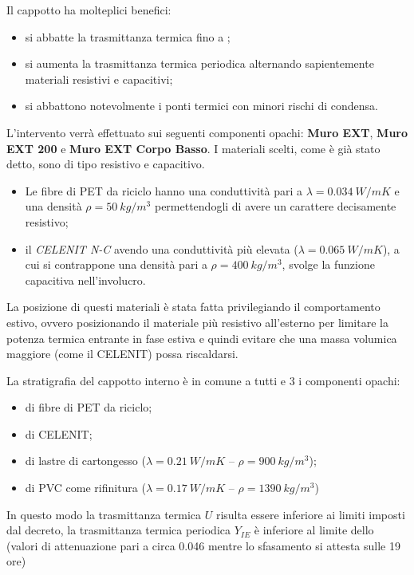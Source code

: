 Il cappotto ha molteplici benefici:
\begin{itemize}
	\item si abbatte la trasmittanza termica fino a ;
	\item si aumenta la trasmittanza termica periodica alternando sapientemente materiali resistivi e capacitivi;
	\item si abbattono notevolmente i ponti termici con minori rischi di condensa.
\end{itemize}
L'intervento verrà effettuato sui seguenti componenti opachi: \textbf{Muro EXT}, \textbf{Muro EXT 200} e \textbf{Muro EXT Corpo Basso}. I materiali scelti, come è già stato detto, sono di tipo resistivo e capacitivo.
\begin{itemize}
	\item Le fibre di PET da riciclo hanno una conduttività pari a $\lambda=\SI{0.034}{W/mK}$ e una densità $\rho=\SI{50}{kg/m^3}$ permettendogli di avere un carattere decisamente resistivo;
	\item il \emph{CELENIT N-C} avendo una conduttività più elevata ($\lambda=\SI{0.065}{W/mK}$), a cui si contrappone una densità pari a $\rho=\SI{400}{kg/m^3}$, svolge la funzione capacitiva nell'involucro.
\end{itemize}
La posizione di questi materiali è stata fatta privilegiando il comportamento estivo, ovvero posizionando il materiale più resistivo all'esterno per limitare la potenza termica entrante in fase estiva e quindi evitare che una massa volumica maggiore (come il CELENIT) possa riscaldarsi.

La stratigrafia del cappotto interno è in comune a tutti e 3 i componenti opachi:
\begin{itemize}
	\item {} di fibre di PET da riciclo;
	\item {} di CELENIT;
	\item {} di lastre di cartongesso ($\lambda=\SI{0.21}{W/mK}$ -- $\rho=\SI{900}{kg/m^3}$);
	\item {} di PVC come rifinitura ($\lambda=\SI{0.17}{W/mK}$ -- $\rho=\SI{1390}{kg/m^3}$)
\end{itemize}

In questo modo la trasmittanza termica $U$ risulta essere inferiore ai limiti imposti dal decreto, la trasmittanza termica periodica $Y_{IE}$ è inferiore al limite dello  (valori di attenuazione pari a circa \num{0.046} mentre lo sfasamento si attesta sulle \num{19} ore)

